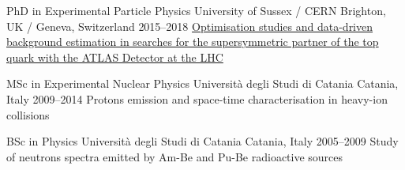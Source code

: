






\begin{cventries}

  \cventry
      {PhD in Experimental Particle Physics}
      {University of Sussex / CERN}
      {Brighton, UK / Geneva, Switzerland}
      {2015--2018}
      {
      \href{http://cds.cern.ch/record/2650559?ln=en}
      {Optimisation studies and data-driven background estimation in searches for the 
      supersymmetric partner of the top quark with the ATLAS Detector at the LHC}
      }

  \cventry
      {MSc in Experimental Nuclear Physics}
      {Università degli Studi di Catania}
      {Catania, Italy}
      {2009--2014}
      {Protons emission and space-time characterisation in heavy-ion collisions}
      
  \cventry
      {BSc in Physics}
      {Università degli Studi di Catania}
      {Catania, Italy}
      {2005--2009}
      {Study of neutrons spectra emitted by Am-Be and Pu-Be radioactive sources}
\end{cventries}


